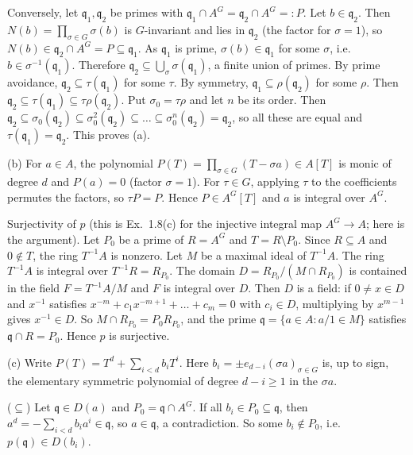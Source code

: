 \documentclass[11pt]{article}
\begin{document}
Conversely, let $\mathfrak q_1,\mathfrak q_2$ be primes with $\mathfrak q_1\cap A^G=\mathfrak q_2\cap A^G=:P$. Let $b\in\mathfrak q_2$. Then $N(b)=\prod_{\sigma\in G}\sigma(b)$ is $G$-invariant and lies in $\mathfrak q_2$ (the factor for $\sigma=1$), so $N(b)\in\mathfrak q_2\cap A^G=P\subseteq\mathfrak q_1$. As $\mathfrak q_1$ is prime, $\sigma(b)\in\mathfrak q_1$ for some $\sigma$, i.e.\ $b\in\sigma^{-1}(\mathfrak q_1)$. Therefore $\mathfrak q_2\subseteq\bigcup_{\sigma}\sigma(\mathfrak q_1)$, a finite union of primes. By prime avoidance, $\mathfrak q_2\subseteq\tau(\mathfrak q_1)$ for some $\tau$. By symmetry, $\mathfrak q_1\subseteq\rho(\mathfrak q_2)$ for some $\rho$. Then $\mathfrak q_2\subseteq\tau(\mathfrak q_1)\subseteq\tau\rho(\mathfrak q_2)$. Put $\sigma_0=\tau\rho$ and let $n$ be its order. Then $\mathfrak q_2\subseteq\sigma_0(\mathfrak q_2)\subseteq\sigma_0^2(\mathfrak q_2)\subseteq\dots\subseteq\sigma_0^n(\mathfrak q_2)=\mathfrak q_2$, so all these are equal and $\tau(\mathfrak q_1)=\mathfrak q_2$. This proves (a).

(b) For $a\in A$, the polynomial $P(T)=\prod_{\sigma\in G}(T-\sigma a)\in A[T]$ is monic of degree $d$ and $P(a)=0$ (factor $\sigma=1$). For $\tau\in G$, applying $\tau$ to the coefficients permutes the factors, so $\tau P=P$. Hence $P\in A^G[T]$ and $a$ is integral over $A^G$.

Surjectivity of $p$ (this is Ex.~1.8(c) for the injective integral map $A^G\to A$; here is the argument). Let $P_0$ be a prime of $R=A^G$ and $T=R\setminus P_0$. Since $R\subseteq A$ and $0\notin T$, the ring $T^{-1}A$ is nonzero. Let $M$ be a maximal ideal of $T^{-1}A$. The ring $T^{-1}A$ is integral over $T^{-1}R=R_{P_0}$. The domain $D=R_{P_0}/(M\cap R_{P_0})$ is contained in the field $F=T^{-1}A/M$ and $F$ is integral over $D$. Then $D$ is a field: if $0\neq x\in D$ and $x^{-1}$ satisfies $x^{-m}+c_1x^{-m+1}+\dots+c_m=0$ with $c_i\in D$, multiplying by $x^{m-1}$ gives $x^{-1}\in D$. So $M\cap R_{P_0}=P_0R_{P_0}$, and the prime $\mathfrak q=\{a\in A:a/1\in M\}$ satisfies $\mathfrak q\cap R=P_0$. Hence $p$ is surjective.

(c) Write $P(T)=T^d+\sum_{i<d}b_iT^i$. Here $b_i=\pm e_{d-i}(\sigma a)_{\sigma\in G}$ is, up to sign, the elementary symmetric polynomial of degree $d-i\ge1$ in the $\sigma a$.

($\subseteq$) Let $\mathfrak q\in D(a)$ and $P_0=\mathfrak q\cap A^G$. If all $b_i\in P_0\subseteq\mathfrak q$, then $a^d=-\sum_{i<d}b_ia^i\in\mathfrak q$, so $a\in\mathfrak q$, a contradiction. So some $b_i\notin P_0$, i.e.\ $p(\mathfrak q)\in D(b_i)$.
\end{document}
